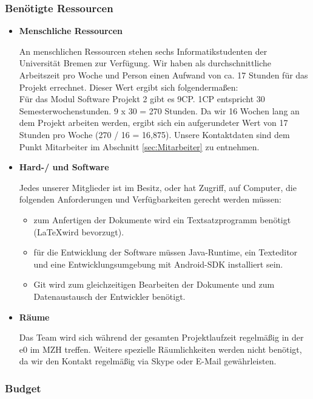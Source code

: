 \documentclass[fontsize=12pt,paper=a4,twoside]{scrartcl}
\begin{document}
\subsubsection{Benötigte Ressourcen}

\begin{itemize}
\item \textbf{Menschliche Ressourcen}

An menschlichen Ressourcen stehen sechs Informatikstudenten der Universität Bremen zur Verfügung. Wir haben als durchschnittliche Arbeitszeit pro Woche und Person einen Aufwand von ca. 17 Stunden für das Projekt errechnet. Dieser Wert ergibt sich folgendermaßen:\\
Für das Modul Software Projekt 2 gibt es 9CP. 1CP entspricht 30 Semesterwochenstunden. 9 x 30 = 270 Stunden. Da wir 16 Wochen lang an dem Projekt arbeiten werden, ergibt sich ein aufgerundeter Wert von 17 Stunden pro Woche (270 / 16 = 16,875). Unsere Kontaktdaten sind dem Punkt Mitarbeiter im Abschnitt \ref{sec:Mitarbeiter} zu entnehmen.

\item \textbf{Hard-/ und Software}

Jedes unserer Mitglieder ist im Besitz, oder hat Zugriff, auf Computer, die folgenden Anforderungen und Verfügbarkeiten gerecht werden müssen:

\begin{itemize}
\item zum Anfertigen der Dokumente wird ein Textsatzprogramm benötigt (\LaTeX wird bevorzugt).
\item für die Entwicklung der Software müssen Java-Runtime, ein Texteditor und eine Entwicklungsumgebung mit Android-SDK installiert sein.
\item Git wird zum gleichzeitigen Bearbeiten der Dokumente und zum Datenaustausch der Entwickler benötigt.
\end{itemize}

\item \textbf{Räume}

Das Team wird sich während der gesamten Projektlaufzeit regelmäßig in der e0 im MZH treffen. Weitere spezielle Räumlichkeiten werden nicht benötigt, da wir den Kontakt regelmäßig via Skype oder E-Mail gewährleisten.

\end{itemize}

\subsubsection{Budget}
\end{document}
